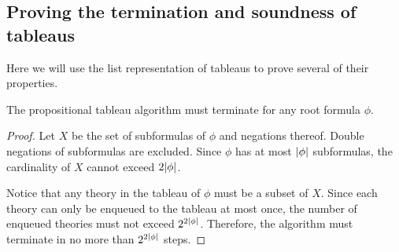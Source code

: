 \subsection{Proving the termination and soundness of tableaus}

Here we will use the list representation of tableaus to prove several of their properties.


\begin{theorem}
    The propositional tableau algorithm must terminate for any root formula \(\phi\). 
\end{theorem}
\begin{proof}
    Let \(X\) be the set of subformulas of \(\phi\) and negations thereof. Double negations of subformulas are excluded. Since \(\phi\) has at most \(|\phi|\) subformulas, the cardinality of \(X\) cannot exceed \(2|\phi|\).

    Notice that any theory in the tableau of \(\phi\) must be a subset of \(X\). Since each theory can only be enqueued to the tableau at most once, the number of enqueued theories must not exceed \(2^{2|\phi|}\). Therefore, the algorithm must terminate in no more than \(2^{2|\phi|}\) steps.
\end{proof}


